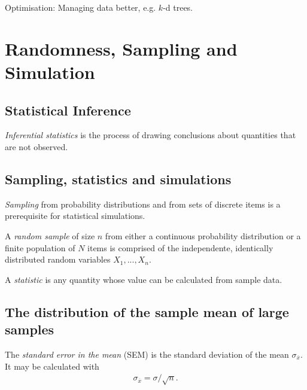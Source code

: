 \documentclass{article}
\renewcommand{\bar}{\overline}
\begin{document}
Optimisation: Managing data better, e.g. $k$-d trees.


\section{Randomness, Sampling and Simulation}


\subsection{Statistical Inference}

\begin{definition}
	\emph{Inferential statistics} is the process of drawing conclusions
	about quantities that are not observed.
\end{definition}

\subsection{Sampling, statistics and simulations}

\begin{definition}
	\emph{Sampling} from probability distributions and from sets of discrete
	items is a prerequisite for statistical simulations.
\end{definition}

\begin{definition}
	A \emph{random sample} of size $n$ from either a continuous probability
	distribution or a finite population of $N$ items is comprised of
	the independente, identically distributed random variables $X_1,...,X_n$.
\end{definition}

\begin{definition}
	A \emph{statistic} is any quantity whose value can be calculated from
	sample data.
\end{definition}

\subsection{The distribution of the sample mean of large samples}

\begin{definition}
	The \emph{standard error in the mean} (SEM) is the standard deviation
	of the mean $\sigma_{\bar x}$. It may be calculated with
	\begin{align*}
		\sigma_{\bar x} = \sigma / \sqrt{n}.
	\end{align*}
\end{definition}
\end{document}
